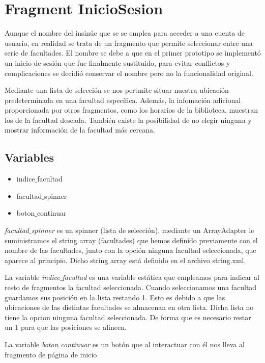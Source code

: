 \section{Fragment InicioSesion}
Aunque el nombre del insinúe que se se emplea para acceder a una cuenta de usuario, en realidad se trata de un fragmento que permite seleccionar entre una serie de facultades. El nombre se debe a que en el primer prototipo se implementó un inicio de sesión que fue finalmente sustituido, para evitar conflictos y complicaciones se decidió conservar el nombre pero no la funcionalidad original.

Mediante una lista de selección se nos pertmite situar nuestra ubicación predeterminada en una facultad específica. Además, la infomación adicional proporcionada por otros fragmentos, como los horarios de la biblioteca, muestran los de la facultad deseada. También existe la posibilidad de no elegir ninguna y mostrar información de la facultad más cercana.

\subsection{Variables}

\begin{itemize}
	\item indice$\_$facultad
	\item facultad$\_$spinner
	\item boton$\_$continuar
\end{itemize}

\textit{facultad$\_$spinner} es un spinner (lista de selección), mediante un ArrayAdapter le suministramos el string array (facultades) que hemos definido previamente con el nombre de las facultades, junto con la opción ninguna facultad seleccionada, que aparece al principio. Dicho string array está definido en el archivo string.xml.

La variable \textit{indice$\_$facultad} es una variable estática que empleamos para indicar al resto de fragmentos la facultad seleccionada. Cuando seleccionamos una facultad guardamos sus posición en la lista restando 1. Esto es debido a que las ubicaciones de las distintas facultades se almacenan en otra lista. Dicha lista no tiene la opcion ninguna facultad seleccionada. De forma que es necesario restar un 1 para que las posiciones se alineen.

La variable \textit{boton$\_$continuar} es un botón que al interactuar con él nos lleva al fragmento de página de inicio



